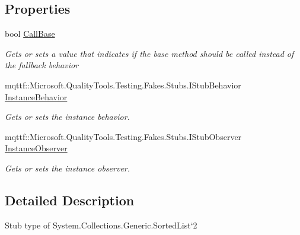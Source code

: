 \subsection*{Properties}
\begin{DoxyCompactItemize}
\item 
bool \hyperlink{class_system_1_1_collections_1_1_generic_1_1_fakes_1_1_stub_sorted_list_3_01_t_key_00_01_t_value_01_4_abe74b2ab6dc14cd5e17097be45e223a2}{Call\-Base}
\begin{DoxyCompactList}\small\item\em Gets or sets a value that indicates if the base method should be called instead of the fallback behavior\end{DoxyCompactList}\item 
mqttf\-::\-Microsoft.\-Quality\-Tools.\-Testing.\-Fakes.\-Stubs.\-I\-Stub\-Behavior \hyperlink{class_system_1_1_collections_1_1_generic_1_1_fakes_1_1_stub_sorted_list_3_01_t_key_00_01_t_value_01_4_a7b7be1939163ccb848167664711e91eb}{Instance\-Behavior}
\begin{DoxyCompactList}\small\item\em Gets or sets the instance behavior.\end{DoxyCompactList}\item 
mqttf\-::\-Microsoft.\-Quality\-Tools.\-Testing.\-Fakes.\-Stubs.\-I\-Stub\-Observer \hyperlink{class_system_1_1_collections_1_1_generic_1_1_fakes_1_1_stub_sorted_list_3_01_t_key_00_01_t_value_01_4_a5855024f8530d1fcb877a598a5b300c5}{Instance\-Observer}
\begin{DoxyCompactList}\small\item\em Gets or sets the instance observer.\end{DoxyCompactList}\end{DoxyCompactItemize}


\subsection{Detailed Description}
Stub type of System.\-Collections.\-Generic.\-Sorted\-List`2



